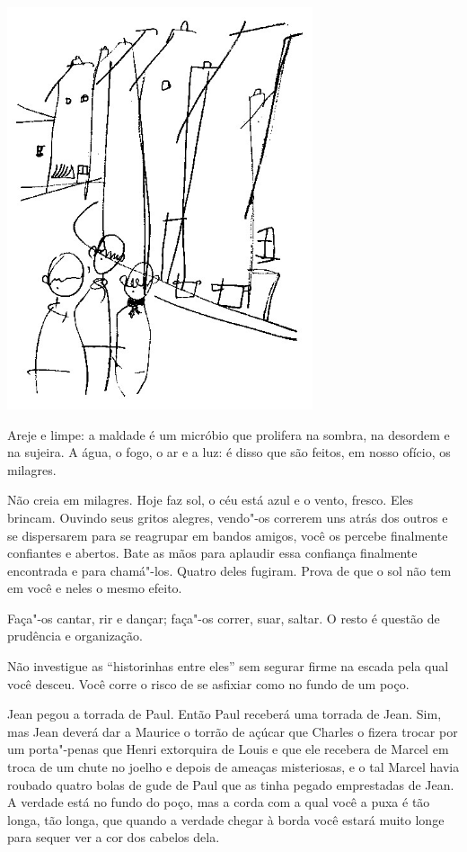 \begin{center}
\includegraphics[width=90mm]{./imgs/Image_9.jpg}
\end{center}

Areje e limpe: a maldade é um micróbio que prolifera na sombra, na
desordem e na sujeira. A água, o fogo, o ar e a luz: é disso que são
feitos, em nosso ofício, os milagres.

\bigskip
\bigskip

Não creia em milagres. Hoje faz sol, o céu está azul e o vento, fresco.
Eles brincam. Ouvindo seus gritos alegres, vendo"-os correrem uns atrás
dos outros e se dispersarem para se reagrupar em bandos amigos, você os
percebe finalmente confiantes e abertos. Bate as mãos para aplaudir essa
confiança finalmente encontrada e para chamá"-los. Quatro deles fugiram.
Prova de que o sol não tem em você e neles o mesmo efeito.

\bigskip
\bigskip

Faça"-os cantar, rir e dançar; faça"-os correr, suar, saltar. O resto é
questão de prudência e organização.

\bigskip
\bigskip

Não investigue as ``historinhas entre eles'' sem segurar firme na escada
pela qual você desceu. Você corre o risco de se asfixiar como no fundo
de um poço.

\bigskip
\bigskip

Jean pegou a torrada de Paul. Então Paul receberá uma torrada de Jean.
Sim, mas Jean deverá dar a Maurice o torrão de açúcar que Charles o
fizera trocar por um porta"-penas que Henri extorquira de Louis e que ele
recebera de Marcel em troca de um chute no joelho e depois de ameaças
misteriosas, e o tal Marcel havia roubado quatro bolas de gude de Paul
que as tinha pegado emprestadas de Jean. A verdade está no fundo do
poço, mas a corda com a qual você a puxa é tão longa, tão longa, que
quando a verdade chegar à borda você estará muito longe para sequer ver
a cor dos cabelos dela.

